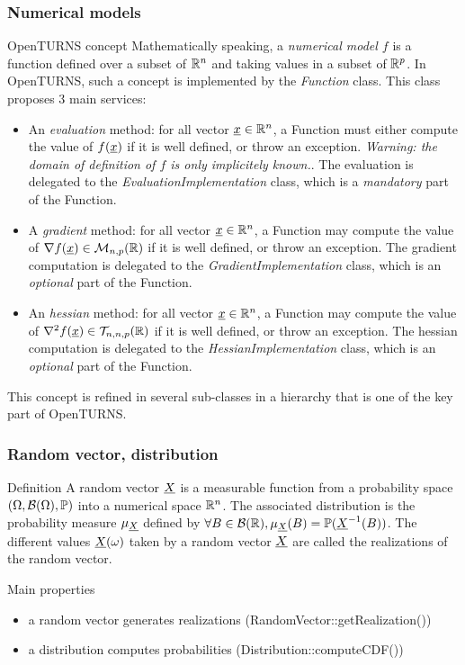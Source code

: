 \documentclass[8pt]{beamer}
\begin{document}
\begin{frame}
  \frametitle{Numerical models}
  \begin{block}{OpenTURNS concept}
    Mathematically speaking, a \emph{numerical model $f$} is a function defined over a subset of $\R^n$ and taking values in a subset of $\R^p$. In OpenTURNS, such a concept is implemented by the \emph{Function} class. This class proposes 3 main services:
    \begin{itemize}
    \item An \emph{evaluation} method: for all vector $\vect{x}\in\R^n$, a Function must either compute the value of $f(\vect{x})$ if it is well defined, or throw an exception. \emph{Warning: the domain of definition of $f$ is only implicitely known.}. The evaluation is delegated to the \emph{EvaluationImplementation} class, which is a \emph{mandatory} part of the Function.
    \item A \emph{gradient} method: for all vector $\vect{x}\in\R^n$, a Function may compute the value of $\nabla f(\vect{x})\in\mathcal{M}_{n,p}(\R)$ if it is well defined, or throw an exception. The gradient computation is delegated to the \emph{GradientImplementation} class, which is an \emph{optional} part of the Function.
    \item An \emph{hessian} method: for all vector $\vect{x}\in\R^n$, a Function may compute the value of $\nabla^2 f(\vect{x})\in\mathcal{T}_{n,n,p}(\R)$ if it is well defined, or throw an exception. The hessian computation is delegated to the \emph{HessianImplementation} class, which is an \emph{optional} part of the Function.
    \end{itemize}
  \end{block}
  This concept is refined in several sub-classes in a hierarchy that is one of the key part of OpenTURNS.
\end{frame}
\begin{frame}
  \frametitle{Random vector, distribution}
  \begin{block}{Definition}
    A \alert{random vector $\vect{X}$} is a measurable function from a probability space $(\Omega, \mathcal{B}(\Omega), \P)$ into a numerical space $\R^n$. The associated \alert{distribution} is the probability measure $\mu_{\vect{X}}$ defined by $\forall B\in\mathcal{B}(\R), \mu_{\vect{X}}(B)=\P(\vect{X}^{-1}(B))$. The different values $\vect{X}(\omega)$ taken by a random vector $\vect{X}$ are called the \alert{realizations} of the random vector.
  \end{block}
  \begin{block}{Main properties}
    \begin{itemize}
    \item a random vector generates realizations (\alert{RandomVector::getRealization()})
    \item a distribution computes probabilities (\alert{Distribution::computeCDF()})
    \end{itemize}
  \end{block}
\end{frame}
\end{document}
